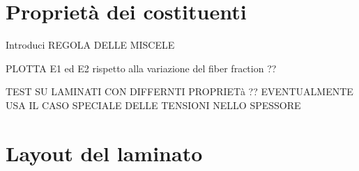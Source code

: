\documentclass[a4paper,num-refs]{oup-contemporary}
\begin{document}
\textcolor{blue}{\lipsum[1-2]}




\section{Proprietà dei costituenti}

Introduci REGOLA DELLE MISCELE

PLOTTA E1 ed E2 rispetto alla variazione del fiber fraction ??

TEST SU LAMINATI CON DIFFERNTI PROPRIETà ??  EVENTUALMENTE USA IL CASO SPECIALE DELLE TENSIONI NELLO SPESSORE

\textcolor{blue}{\lipsum[1-2]}
\section{Layout del laminato}
\end{document}
